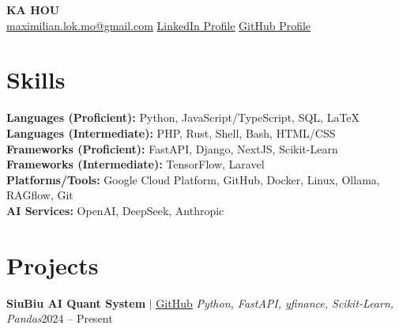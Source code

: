 \documentclass[UTF8]{ctexart} %
\begin{document}
\begin{center}
    \textbf{\Huge \scshape KA HOU } \\
    \vspace{6pt}
    \small
     \href{mailto:maximilian.lok.mo@gmail.com}{\underline{maximilian.lok.mo@gmail.com}} \quad
     \href{https://www.linkedin.com/in/maximilianlok}{\underline{LinkedIn Profile}} \quad
     \href{https://github.com/BiuwuLOK}{\underline{GitHub Profile}}
\end{center}

\section{Skills}
\begin{itemize}[leftmargin=0.15in, label={}, itemsep=2pt]
    \small{\item{
        \textbf{Languages (Proficient):} Python, JavaScript/TypeScript, SQL, \LaTeX \\
        \textbf{Languages (Intermediate):} PHP, Rust, Shell, Bash, HTML/CSS \\
        \vspace{2pt}
        \textbf{Frameworks (Proficient):} FastAPI, Django, NextJS, Scikit-Learn \\
        \textbf{Frameworks (Intermediate):} TensorFlow, Laravel \\
        \vspace{2pt}
        \textbf{Platforms/Tools:} Google Cloud Platform, GitHub, Docker, Linux, Ollama, RAGflow, Git \\
        \vspace{2pt}
        \textbf{AI Services:} OpenAI, DeepSeek, Anthropic
    }}
\end{itemize}

\section{Projects}
\resumeSubHeadingListStart
    \resumeProjectHeading
        {\textbf{SiuBiu AI Quant System} $|$ \href{https://github.com/BiuwuLOK/SIUBIU-AI-QUANT-SYSTEM}{\underline{GitHub}} \footnotesize\emph{Python, FastAPI, yfinance, Scikit-Learn, Pandas}}{2024 -- Present}
        \resumeItemListStart
        \resumeItemListEnd
\end{document}

